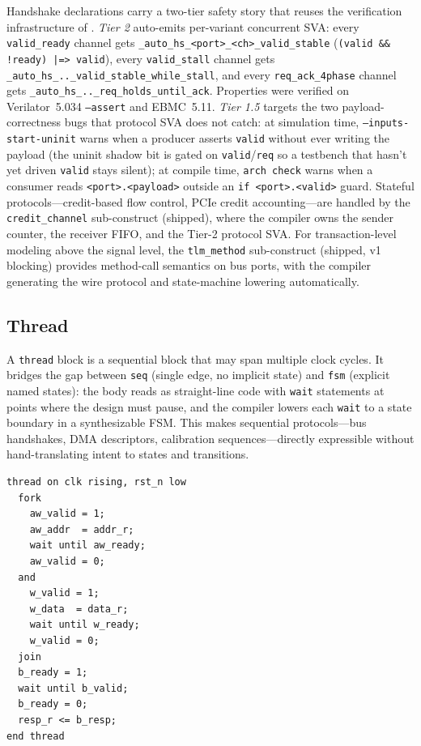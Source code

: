 \documentclass[11pt,twocolumn]{article}
\begin{document}
Handshake declarations carry a two-tier safety story that reuses the verification infrastructure of . \emph{Tier 2} auto-emits per-variant concurrent SVA: every \texttt{valid\_ready} channel gets \texttt{\_auto\_hs\_<port>\_<ch>\_valid\_stable} (\texttt{(valid \&\& !ready) |=> valid}), every \texttt{valid\_stall} channel gets \texttt{\_auto\_hs\_..\_valid\_stable\_while\_stall}, and every \texttt{req\_ack\_4phase} channel gets \texttt{\_auto\_hs\_..\_req\_holds\_until\_ack}. Properties were verified on Verilator~5.034 \texttt{--assert} and EBMC~5.11. \emph{Tier 1.5} targets the two payload-correctness bugs that protocol SVA does not catch: at simulation time, \texttt{--inputs-start-uninit} warns when a producer asserts \texttt{valid} without ever writing the payload (the uninit shadow bit is gated on \texttt{valid}/\texttt{req} so a testbench that hasn't yet driven \texttt{valid} stays silent); at compile time, \texttt{arch check} warns when a consumer reads \texttt{<port>.<payload>} outside an \texttt{if <port>.<valid>} guard. Stateful protocols---credit-based flow control, PCIe credit accounting---are handled by the \texttt{credit\_channel} sub-construct (shipped), where the compiler owns the sender counter, the receiver FIFO, and the Tier-2 protocol SVA. For transaction-level modeling above the signal level, the \texttt{tlm\_method} sub-construct (shipped, v1 blocking) provides method-call semantics on bus ports, with the compiler generating the wire protocol and state-machine lowering automatically.

\subsection{Thread}\label{sec:thread}

A \texttt{thread} block is a sequential block that may span multiple clock cycles. It bridges the gap between \texttt{seq} (single edge, no implicit state) and \texttt{fsm} (explicit named states): the body reads as straight-line code with \texttt{wait} statements at points where the design must pause, and the compiler lowers each \texttt{wait} to a state boundary in a synthesizable FSM. This makes sequential protocols---bus handshakes, DMA descriptors, calibration sequences---directly expressible without hand-translating intent to states and transitions.

\begin{lstlisting}[language=Arch,caption={AXI write transaction as a thread},label={lst:thread}]
thread on clk rising, rst_n low
  fork
    aw_valid = 1;
    aw_addr  = addr_r;
    wait until aw_ready;
    aw_valid = 0;
  and
    w_valid = 1;
    w_data  = data_r;
    wait until w_ready;
    w_valid = 0;
  join
  b_ready = 1;
  wait until b_valid;
  b_ready = 0;
  resp_r <= b_resp;
end thread
\end{lstlisting}
\end{document}

